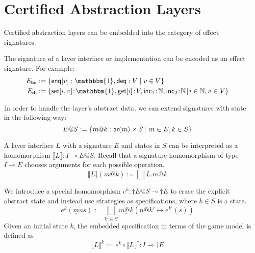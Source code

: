 \documentclass[sigplan,10pt,authordraft]{acmart}
\begin{document}
\section{Certified Abstraction Layers}

Certified abstraction layers can be embedded into the category of effect
signatures.

The signature of a layer interface or implementation
can be encoded as an effect signature.
For example:
\begin{align*}
  E_\kw{bq} &:= \{
    \kw{enq}[v] : \mathbbm{1}, \kw{deq} : V \mid
    v \in V \} \\
  E_\kw{rb} &:= \{
    \kw{set}[i, v] \! : \! \mathbbm{1},
    \kw{get}[i] \! : \! V,
    \kw{inc}_1 \! : \! \mathbb{N},
    \kw{inc}_2 \! : \! \mathbb{N} \! \mid \!
    i \in \mathbb{N}, v \in V \}
\end{align*}

In order to handle the layer's abstract data,
we can extend signatures with state in the following way:
\[
  E@S :=
    \{ m@k :  \mathsf{ar} (m) \times S \mid
       m \in E, k \in S \}
\]

A layer interface $L$ with a signature $E$
and states in $S$
can be interpreted as
a homomorphism $\llbracket L \rrbracket : I \multimap E@S$.
Recall that a signature homomorphism of type $I \multimap E$
chooses arguments for each possible operation.
\[
  \llbracket L \rrbracket (m@k) :=
    \bigsqcup L.m@k
\]

We introduce a special homomorphism $e^k : \dagger E@S \multimap \dagger E$
to erase the explicit abstract state and instead use
strategies as specifications, where $k \in S$
is a state.
\[
  e^k(\underline{m}ns) \mathrel{:=} \bigsqcup_{k'\in S} \underline{m@k}(n@k' \mapsto e^{k'}(s))
\]
Given an initial state $k$, the embedded specification
in terms of the game model is defined as
\[
  \llbracket L \rrbracket^k \mathrel{:=} e^k \circ \llbracket L \rrbracket^\dagger : I \multimap \dagger E
\]
\end{document}
